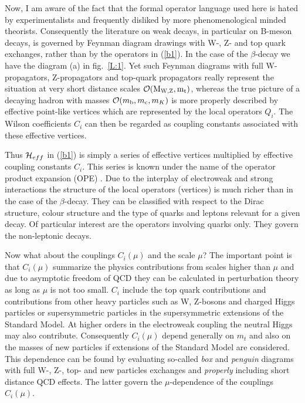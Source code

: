 \documentclass[12pt]{article}
\newcommand{\mc}{m_{\rm c}}
\newcommand{\mb}{m_{\rm b}}
\newcommand{\ord}{{\cal O}}
\begin{document}
Now, I am aware of the fact that the formal operator language used here is
hated by experimentalists and frequently disliked by more phenomenological
minded theorists. Consequently the literature on weak decays, in particular
on B-meson decays, is governed by Feynman diagram drawings with W-, Z- and top
quark exchanges, rather than by the operators in (\ref{b1}). 
In the case of the $\beta$-decay we have the diagram (a) in fig.~\ref{L:1}.
Yet such Feynman
diagrams with full W-propagators, Z-propagators and top-quark propagators
really represent the situation at very short distance scales 
$\ord ({\rm M_{W,Z}, m_t})$, whereas the
true picture of a decaying hadron with masses 
$\ord(\mb,\mc,m_K)$ is more properly described by
effective point-like vertices which are represented by the local operators
$Q_i$. The Wilson coefficients $C_i$ can then be regarded as coupling constants
associated with these effective vertices.

Thus ${\cal H}_{eff}$ in (\ref{b1}) is simply a series of effective 
vertices multiplied 
by effective coupling constants $C_i$. This series is known under the name 
of the operator product expansion (OPE) \cite{OPE,ZIMM,WIT}. 
Due to the interplay of electroweak 
and strong interactions the structure of the local operators (vertices) is 
much richer than in the case of the $\beta$-decay. They can be classified 
with respect to the Dirac structure, colour structure and the type of quarks 
and leptons relevant for a given decay. Of particular interest are the 
operators involving quarks only. They govern the non-leptonic decays.

Now what about the couplings $C_i(\mu)$ and the scale $\mu$? The 
important point is that $C_i(\mu)$
summarize the physics contributions from scales higher than $\mu$ and due to
asymptotic freedom of QCD they can be calculated in perturbation theory as
long as $\mu$ is not too small. $C_i$ include the top quark contributions and
contributions from other heavy particles such as W, Z-bosons and charged
Higgs particles or supersymmetric particles in the supersymmetric extensions
of the Standard Model. At higher orders in the electroweak coupling the
neutral Higgs may also contribute. Consequently $C_i(\mu)$ depend generally 
on $m_t$ and also on the masses of new particles if extensions of the 
Standard Model are considered. This dependence can be found by evaluating 
so-called {\it box} and {\it penguin} diagrams with full W-, Z-, top- and 
new particles exchanges and {\it properly} including short distance QCD 
effects. The latter govern the $\mu$-dependence of the couplings $C_i(\mu)$.
\end{document}
